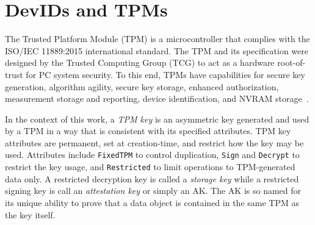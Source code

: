 \documentclass[runningheads]{llncs}
\begin{document}
\section{DevIDs and TPMs}
The Trusted Platform Module (TPM) is a microcontroller that complies
with the ISO/IEC 11889:2015 international standard.  The TPM and its
specification were designed by the Trusted Computing Group (TCG) to
act as a hardware root-of-trust for PC system security. To this end,
TPMs have capabilities for secure key generation, algorithm agility,
secure key storage, enhanced authorization, measurement storage and
reporting, device identification, and NVRAM
storage~\citep{PracticalGuide}.

In the context of this work, a \emph{TPM key} is an asymmetric key generated
and used by a TPM in a way that is consistent with its specified attributes.
TPM key attributes are permanent, set at creation-time, and restrict how the key may
be used. Attributes include \verb|FixedTPM| to control duplication,
\verb|Sign| and \verb|Decrypt| to restrict the key usage, and
\verb|Restricted| to limit operations to TPM-generated data only.  A
restricted decryption key is called a \emph{storage key} while a
restricted signing key is call an \emph{attestation key} or simply an
AK.  The AK is so named for its unique ability to prove that a data
object is contained in the same TPM as the key itself.




\end{document}
